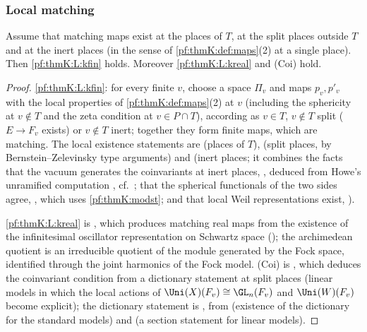 \subsubsection{Local matching}\label{sec:pf:thmK:local}

\begin{proposition}\label{pf:thmK:localmatching}
Assume that matching maps exist at the places of $T$, at the split places outside $T$ and at the inert places (in the sense
of \cref{pf:thmK:def:maps}(2) at a single place). Then \ref{pf:thmK:L:kfin} holds. Moreover \ref{pf:thmK:L:kreal} and
\textup{(Coi)} hold.
\end{proposition}

\begin{proof}
\ref{pf:thmK:L:kfin}: for every finite $v$, choose a space $\Pi_v$ and maps $p_v,p'_v$ with the local properties of
\cref{pf:thmK:def:maps}(2) at $v$ (including the sphericity at $v\notin T$ and the zeta condition at $v\in P\cap T$),
according as $v\in T$, $v\notin T$ split ($E\to F_v$ exists) or $v\notin T$ inert; together they form finite maps, which
are matching. The local existence statements are  (places of
$T$),  (split places, by Bernstein--Zelevinsky type arguments)
and  (inert places; it combines the facts that the vacuum generates the
coinvariants at inert places, , deduced from Howe's unramified computation
, cf.\ \cite{Howe1979}; that the spherical functionals of the two sides agree,
, which uses \cref{pf:thmK:modst}; and that local Weil representations exist,
).

\ref{pf:thmK:L:kreal} is , which produces matching real maps from the existence of the
infinitesimal oscillator representation on Schwartz space (); the archimedean
quotient is an irreducible quotient of the module generated by the Fock space, identified through the joint harmonics of the
Fock model. \textup{(Coi)} is , which deduces the coinvariant
condition from a dictionary statement at split places (linear models in which the local actions of $\Uni(X)(F_v)\cong
\GL_n(F_v)$ and $\Uni(W)(F_v)$ become explicit); the dictionary statement is , from
 (existence of the dictionary for the standard models) and
 (a section statement for linear models).
\end{proof}

